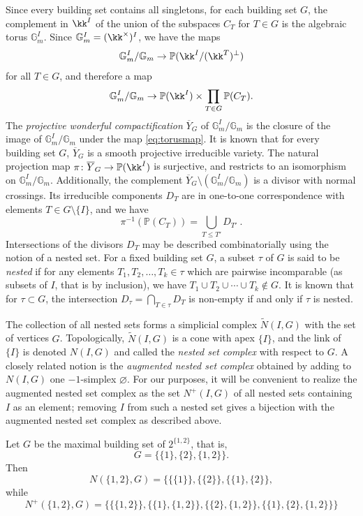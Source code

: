 Since every building set contains all singletons, for each building set $G$, the complement in $\kk^I$ of the union of the subspaces $C_T$ for $T\in G$ is the algebraic torus $\mathbb{G}_m^I$. Since $\mathbb{G}_m^I=(\kk^\times)^I$, we have the maps 
 \[
\mathbb{G}_m^I/\mathbb{G}_m\to\mathbb{P}(\kk^I/(\kk^T)^\bot)
 \]
for all $T\in G$, and therefore a map
\begin{equation}\label{eq:torusmap}
\mathbb{G}_m^I/\mathbb{G}_m\to\mathbb{P}(\kk^I)\times\prod_{T\in G} \mathbb{P}(C_T) .
\end{equation} 
The \emph{projective wonderful compactification} $\overline{Y}_G$ of $\mathbb{G}_m^I/\mathbb{G}_m$ is the closure of the image of $\mathbb{G}_m^I/\mathbb{G}_m$ under the map \eqref{eq:torusmap}. It is known that for every building set $G$, $\overline{Y}_G$ is a smooth projective irreducible variety. The natural projection map $\pi\colon \overline{Y}_G\to \mathbb{P}(\kk^I)$ is surjective, and restricts to an isomorphism on $\mathbb{G}_m^I/\mathbb{G}_m$. Additionally, the complement $\overline{Y}_G\setminus (\mathbb{G}_m^I/\mathbb{G}_m)$ is a divisor with normal crossings. Its irreducible components $D_T$ are in one-to-one correspondence with elements $T\in G\setminus\{I\}$, and we have 
    \[
\pi^{-1}(\mathbb{P}(C_T))=\bigcup_{T\leq T'} D_{T'} \ .  
    \]
Intersections of the divisors $D_T$ may be described combinatorially using the notion of a nested set. For a fixed building set $G$, a subset $\tau$ of $G$ is said to be \emph{nested} if for any elements $T_1,T_2,\ldots,T_k\in \tau$ which are pairwise incomparable (as subsets of $I$, that is by inclusion), we have $T_1\cup T_2\cup \cdots\cup T_k\notin G$. It is known that for $\tau\subset G$, the intersection $D_\tau=\bigcap_{T\in \tau} D_T$ is non-empty if and only if $\tau$ is nested. 

The collection of all nested sets forms a simplicial complex $\tilde{N}(I,G)$ with the set of vertices $G$. Topologically, $\tilde{N}(I,G)$ is a cone with apex $\{I\}$, and the link of $\{I\}$ is denoted $N(I,G)$ and called the \emph{nested set complex} with respect to $G$. 
A closely related notion is the \emph{augmented nested set complex} obtained by adding to $N(I,G)$ one $-1$-simplex $\varnothing$. For our purposes, it will be convenient to realize the augmented nested set complex as the set $N^+(I,G)$ of all nested sets containing~$I$ as an element; removing $I$ from such a nested set gives a bijection with the augmented nested set complex as described above. 

\begin{exam}
Let $G$ be the maximal building set of $2^{\{1,2\}}$, that is, \[G=\{\{1\},\{2\},\{1,2\}\}.\] Then 
 \[
N(\{1,2\},G)=\{
\{\{1\}\},
\{\{2\}\},
\{\{1\},\{2\}\},
 \]
while 
 \[ 
N^+(\{1,2\},G)=\{
\{\{1,2\}\},
\{\{1\},\{1,2\}\},
\{\{2\},\{1,2\}\},
\{\{1\},\{2\},\{1,2\}\}
\}
 \]
\end{exam}

